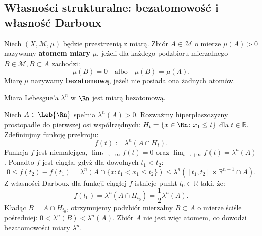 \subsection{Własności strukturalne: bezatomowość i własność Darboux}

\begin{defi}
    Niech $(X, \mathcal{M}, \mu)$ będzie przestrzenią z miarą. Zbiór $A \in \mathcal{M}$ o mierze $\mu(A) > 0$ nazywamy \textbf{atomem miary} $\mu$, jeżeli dla każdego podzbioru mierzalnego $B \in \mathcal{M}, B \subset A$ zachodzi:
    \begin{equation}
        \mu(B) = 0 \quad \text{albo} \quad \mu(B) = \mu(A).
    \end{equation}
    Miarę $\mu$ nazywamy \textbf{bezatomową}, jeżeli nie posiada ona żadnych atomów.
\end{defi}

\begin{tw}
    Miara Lebesgue'a $\lambda^n$ w $\Rn$ jest miarą bezatomową.
\end{tw}

\begin{dow}
    Niech $A \in \Leb{\Rn}$ spełnia $\lambda^n(A) > 0$. Rozważmy hiperpłaszczyzny prostopadłe do pierwszej osi współrzędnych: $H_t = \{x \in \Rn \colon x_1 \le t\}$ dla $t \in \mathbb{R}$. Zdefiniujmy funkcję przekroju:
    \begin{equation*}
        f(t) := \lambda^n(A \cap H_t).
    \end{equation*}
    Funkcja $f$ jest niemalejąca, $\lim_{t \to -\infty} f(t) = 0$ oraz $\lim_{t \to +\infty} f(t) = \lambda^n(A)$. Ponadto $f$ jest ciągła, gdyż dla dowolnych $t_1 < t_2$:
    \begin{equation*}
        0 \le f(t_2) - f(t_1) = \lambda^n(A \cap \{x \colon t_1 < x_1 \le t_2\}) \le \lambda^n([t_1, t_2] \times \mathbb{R}^{n-1} \cap A).
    \end{equation*}
    Z własności Darboux dla funkcji ciągłej $f$ istnieje punkt $t_0 \in \mathbb{R}$ taki, że:
    \begin{equation*}
        f(t_0) = \lambda^n(A \cap H_{t_0}) = \frac{1}{2} \lambda^n(A).
    \end{equation*}
    Kładąc $B = A \cap H_{t_0}$, otrzymujemy podzbiór mierzalny $B \subset A$ o mierze ściśle pośredniej: $0 < \lambda^n(B) < \lambda^n(A)$. Zbiór $A$ nie jest więc atomem, co dowodzi bezatomowości miary $\lambda^n$.
\end{dow}

